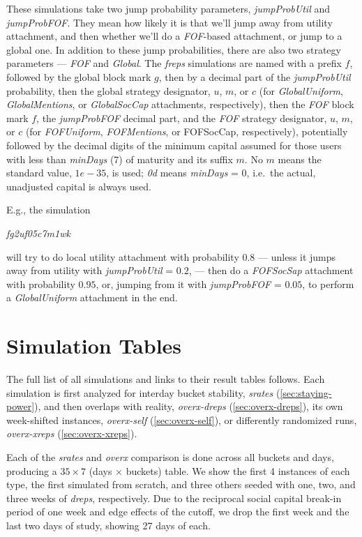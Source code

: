 \documentclass[10pt,oneside]{memoir}
\begin{document}
These simulations take two jump probability parameters, {\itshape jumpProbUtil} and {\itshape jumpProbFOF}.  They mean how likely it is that we'll jump away from utility attachment, and then whether we'll do a {\itshape FOF}-based attachment, or jump to a global one.  In addition to these jump probabilities, there are also two strategy parameters --- {\itshape FOF} and {\itshape Global}.
The {\itshape freps} simulations are named with a prefix $f$, followed by the global block mark $g$, then by a decimal part of the {\itshape jumpProbUtil} probability, then the global strategy designator, $u$, $m$, or $c$ (for {\itshape GlobalUniform}, {\itshape GlobalMentions}, or {\itshape GlobalSocCap} attachments, respectively), then the {\itshape FOF} block mark $f$, the {\itshape jumpProbFOF} decimal part, and the {\itshape FOF} strategy designator, $u$, $m$, or $c$ (for {\itshape FOFUniform}, {\itshape FOFMentions}, or FOFSocCap, respectively), potentially followed by the decimal digits of the minimum capital assumed for those users with less than {\itshape minDays} (7) of maturity and its suffix $m$.  No $m$ means the standard value, $1e-35$, is used; {\itshape 0d} means {\itshape minDays} = $0$, i.e.\ the actual, unadjusted capital is always used.


E.g., the simulation


{\itshape fg2uf05c7m1wk}


will try to do local utility attachment with probability $0.8$ --- unless it jumps away from utility with {\itshape jumpProbUtil} = $0.2$, --- then do a {\itshape FOFSocSap} attachment with probability $0.95$, or, jumping from it with {\itshape jumpProbFOF} = $0.05$, to perform a {\itshape GlobalUniform} attachment in the end.


\section{Simulation Tables}
\label{simulationtables}

The full list of all simulations and links to their result tables follows.  Each simulation is first analyzed for interday bucket stability, {\itshape srates} (\ref{sec:staying-power}), and then overlaps with reality, {\itshape overx-dreps} (\ref{sec:overx-dreps}), its own week-shifted instances, {\itshape overx-self} (\ref{sec:overx-self}), or differently randomized runs, {\itshape overx-xreps} (\ref{sec:overx-xreps}).


Each of the {\itshape srates} and {\itshape overx} comparison is done across all buckets and days, producing a $35 \times 7$ (days $\times$ buckets) table.  We show the first 4 instances of each type, the first simulated from scratch, and three others seeded with one, two, and three weeks of {\itshape dreps}, respectively.  Due to the reciprocal social capital break-in period of one week and edge effects of the cutoff, we drop the first week and the last two days of study, showing 27 days of each.
\end{document}
